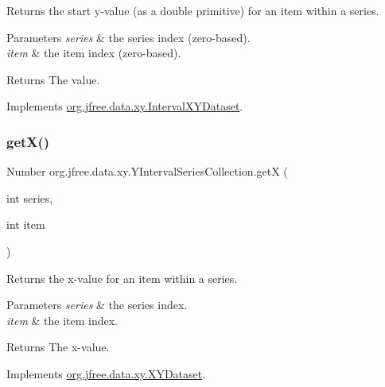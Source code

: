 Returns the start y-\/value (as a double primitive) for an item within a series.


\begin{DoxyParams}{Parameters}
{\em series} & the series index (zero-\/based). \\
\hline
{\em item} & the item index (zero-\/based).\\
\hline
\end{DoxyParams}
\begin{DoxyReturn}{Returns}
The value. 
\end{DoxyReturn}


Implements \mbox{\hyperlink{interfaceorg_1_1jfree_1_1data_1_1xy_1_1_interval_x_y_dataset_aed1acf6e36561ce5acc3f6811a2ecef9}{org.\+jfree.\+data.\+xy.\+Interval\+X\+Y\+Dataset}}.

\mbox{\label{classorg_1_1jfree_1_1data_1_1xy_1_1_y_interval_series_collection_aea821e6f7de4ea55e3ebf533ae124c10}} 
\subsubsection{\texorpdfstring{get\+X()}{getX()}}
{\footnotesize\ttfamily Number org.\+jfree.\+data.\+xy.\+Y\+Interval\+Series\+Collection.\+getX (\begin{DoxyParamCaption}\item[{int}]{series,  }\item[{int}]{item }\end{DoxyParamCaption})}

Returns the x-\/value for an item within a series.


\begin{DoxyParams}{Parameters}
{\em series} & the series index. \\
\hline
{\em item} & the item index.\\
\hline
\end{DoxyParams}
\begin{DoxyReturn}{Returns}
The x-\/value. 
\end{DoxyReturn}


Implements \mbox{\hyperlink{interfaceorg_1_1jfree_1_1data_1_1xy_1_1_x_y_dataset_a85c75ba5b69b551e96afd29d1732ba22}{org.\+jfree.\+data.\+xy.\+X\+Y\+Dataset}}.

